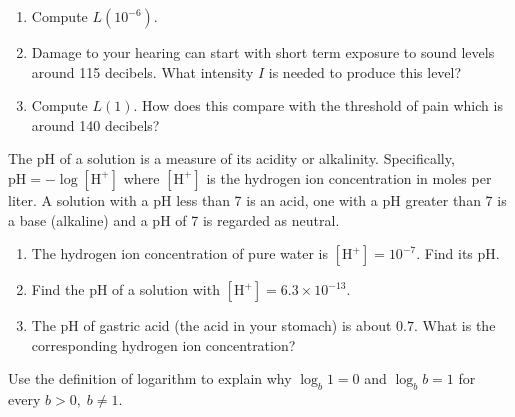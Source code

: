 \documentclass{ximera}
\begin{document}
\begin{question}
\begin{problem}
\begin{enumerate}

\item Compute $L(10^{-6})$.
\item Damage to your hearing can start with short term exposure to sound levels around 115 decibels.  What intensity $I$ is needed to produce this level? 
\item Compute $L(1)$.  How does this compare with the threshold of pain which is around 140 decibels?

\end{enumerate}
\end{problem}

\begin{problem}\label{pHexercise}
The pH of a solution is a measure of its acidity or alkalinity.  Specifically, $\mbox{pH} = -\log[\mbox{H}^{+}]$ where $[\mbox{H}^{+}]$ is the hydrogen ion concentration in moles per liter.  A solution with a pH less than 7 is an acid, one with a pH greater than 7 is a base (alkaline) and a pH of 7 is regarded as neutral.

\begin{enumerate}

\item The hydrogen ion concentration of pure water is $[\mbox{H}^{+}] = 10^{-7}$.  Find its pH.
\item Find the pH of a solution with $[\mbox{H}^{+}] = 6.3 \times 10^{-13}$.
\item The pH of gastric acid (the acid in your stomach) is about $0.7$.  What is the corresponding hydrogen ion concentration?

\end{enumerate}

\end{problem}

\end{question}

\begin{problem}
Use the definition of logarithm to explain why  $\log_{b} 1 = 0$ and $\log_{b} b = 1$ for every $b > 0, \; b \neq 1$.
\end{problem}
\end{document}
